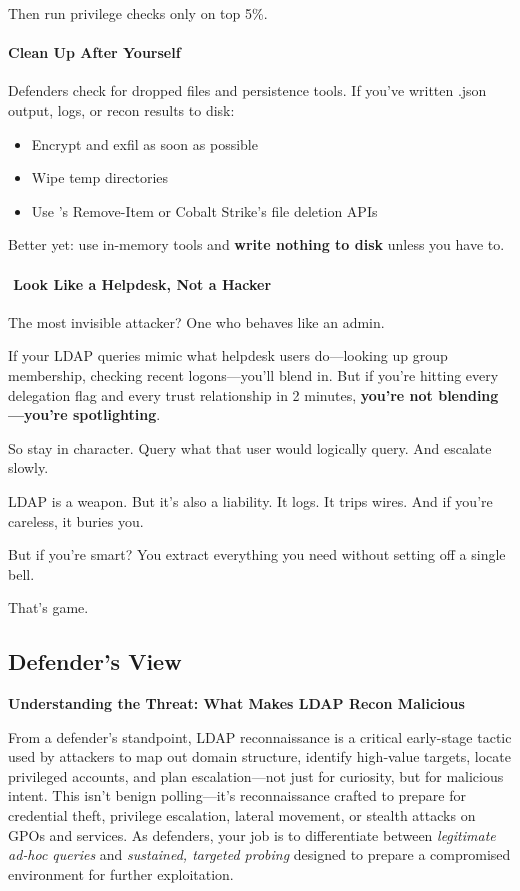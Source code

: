 {{Then run privilege checks only on top 5\%.

\paragraph{\textbf{   Clean Up After Yourself}}

Defenders check for dropped files and persistence tools. If you’ve written .json output, logs, or recon results to disk:

\begin{itemize}
    \item Encrypt and exfil as soon as possible

    \item Wipe temp directories

    \item Use  ’s Remove-Item or Cobalt Strike’s file deletion APIs

\end{itemize}
Better yet: use in-memory tools and \textbf{write nothing to disk} unless you have to.

\paragraph{\textbf{  ️ Look Like a Helpdesk, Not a Hacker}}

The most invisible attacker? One who behaves like an admin.

If your LDAP queries mimic what helpdesk users do—looking up group membership, checking recent logons—you’ll blend in. But if you’re hitting every delegation flag and every trust relationship in 2 minutes, \textbf{you’re not blending—you’re spotlighting}.

So stay in character. Query what that user would logically query. And escalate slowly.

LDAP is a weapon. But it’s also a liability. It logs. It trips wires. And if you’re careless, it buries you.

But if you’re smart? You extract everything you need without setting off a single bell.

That’s game.

\subsection{\textbf{Defender’s View}}

\textbf{Understanding the Threat: What Makes LDAP Recon Malicious}

From a defender’s standpoint, LDAP reconnaissance is a critical early-stage tactic used by attackers to map out domain structure, identify high‑value targets, locate privileged accounts, and plan escalation—not just for curiosity, but for malicious intent. This isn’t benign polling—it’s reconnaissance crafted to prepare for credential theft, privilege escalation, lateral movement, or stealth attacks on GPOs and services. As defenders, your job is to differentiate between \textit{legitimate ad‑hoc queries} and \textit{sustained, targeted probing} designed to prepare a compromised environment for further exploitation.

}}
